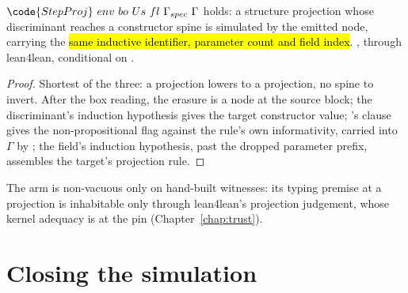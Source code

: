 \begin{theorem}
\label{thm:step_proj}
\leanok
{}
 $\code{StepProj}\ env\ bo\ Us\ fl\ \Gamma_{spec}\ \Gamma$ holds: a structure projection
whose discriminant reaches a constructor spine is simulated by the emitted  node, carrying the
\hl{same inductive identifier, parameter count and field index}.
 \stProved{}, \stInherited{} through lean4lean, conditional on \stAssumed{}
.
\end{theorem}
\begin{proof}
\leanok
{}
 Shortest of the three: a projection lowers to a projection, no spine to invert. After the box
reading, the erasure is a  node at the source block; the discriminant's induction hypothesis
gives the target constructor value; \ErasesEnv{}'s  clause gives the non-propositional flag
against the rule's own informativity, carried into $\Gamma$ by \LowerEnv{}; the field's induction
hypothesis, past the dropped parameter prefix, assembles the target's projection rule.
\end{proof}

\begin{remark}
 The arm is non-vacuous only on hand-built witnesses: its typing premise at a
projection is inhabitable only through lean4lean's projection judgement, whose kernel adequacy is
 at the pin (Chapter~\ref{chap:trust}).
\end{remark}

\section{Closing the simulation}
\label{sec:correctness:close}

